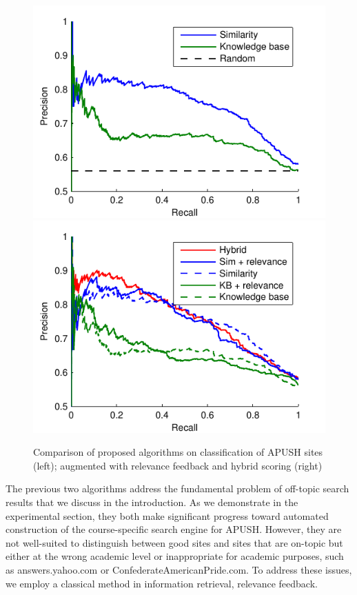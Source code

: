 \documentclass[pdfpagelabels=false,plainpages=true]{acm_proc_article-sp}
\begin{document}
\begin{figure}[t!]
\includegraphics{expt}
\includegraphics{expt_relevance}
\caption{Comparison of proposed algorithms on classification of APUSH
  sites (left); augmented with relevance feedback and hybrid scoring (right)}
\label{fig-expt}
\end{figure}

The previous two algorithms address the fundamental problem of off-topic search
results that we discuss in the introduction. As we demonstrate in the
experimental section, they both make significant progress toward automated
construction of the course-specific search engine for APUSH. However, they are
not well-suited to distinguish between good sites and sites that are on-topic
but either at the wrong academic level or inappropriate for academic purposes,
such as answers.yahoo.com or ConfederateAmericanPride.com. To address these
issues, we employ a classical method in information retrieval, relevance feedback. 
\end{document}
